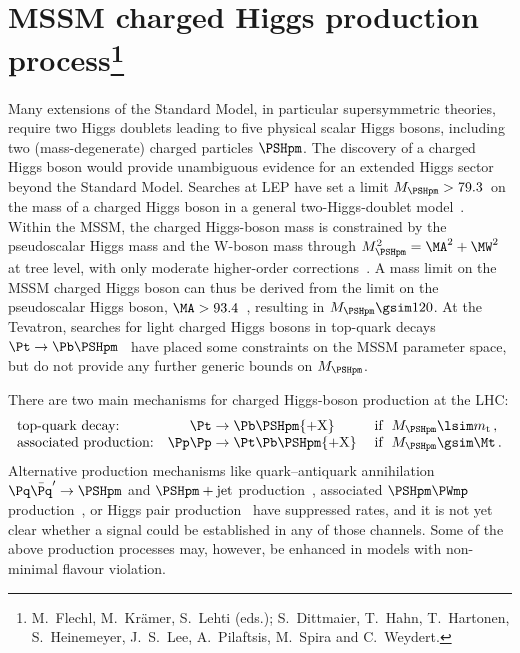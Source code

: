 \newcommand{\MHpm}{M_{\PSHpm}}

\section{MSSM charged Higgs production process\footnote{M.~Flechl,
    M.~Kr\"amer, S.~Lehti (eds.); S.~Dittmaier, T.~Hahn, 
    T.~Hartonen, S.~Heinemeyer, J.~S.~Lee, A.~Pilaftsis, 
    M.~Spira and C.~Weydert.}}
\label{sec:chiggs_intro}

Many extensions of the Standard Model, in particular supersymmetric
theories, require two Higgs doublets leading to five physical scalar
Higgs bosons, including two (mass-degenerate) charged particles $\PSHpm$.
The discovery of a charged Higgs boson would provide
unambiguous evidence for an extended Higgs sector beyond the Standard
Model. Searches at LEP have set a limit $\MHpm > 79.3$\UGeV\ 
on the mass of a charged Higgs boson in a general two-Higgs-doublet
model~\cite{Heister:2002ev}. Within the MSSM, the charged Higgs-boson
mass is constrained by the pseudoscalar Higgs mass and the W-boson
mass through $\MHpm^2 = \MA^2 + \MW^2$ at
tree level, with only moderate higher-order
corrections~\cite{Gunion:1988pc, Brignole:1991wp, Diaz:1991ki,
  Frank:2006yh}. A mass limit on the MSSM charged Higgs boson can thus
be derived from the limit on the pseudoscalar Higgs boson, 
$\MA > 93.4$\UGeV~\cite{Schael:2006cr}, resulting in 
$\MHpm \gsim 120$\UGeV. At the Tevatron, searches for light charged
Higgs bosons in top-quark decays $\Pt \to \Pb \PSHpm$~\cite{Aaltonen:2009ke,:2009zh} have placed some constraints
on the MSSM parameter space, but do not provide any further generic
bounds on $\MHpm$.

There are two main mechanisms for charged Higgs-boson production at
the LHC:
\begin{displaymath}
\begin{array}{lcl}
  \mbox{top-quark decay:} & \Pt \to \Pb \PSHpm{\rm + X} &\; {\rm if}\;\;
  \MHpm \lsim m_{\rm t}\,, \\
  \mbox{associated production:} & \Pp\Pp \to \Pt \Pb\PSHpm{\rm + X}
  &\; {\rm if}\;\; \MHpm \gsim \Mt\,.
\end{array}
\end{displaymath}
Alternative production mechanisms like quark--antiquark annihilation
$\Pq\bar \Pq'\to \PSHpm$ and $\PSHpm+\mathrm{jet}$ production~\cite{Dittmaier:2007uw},
associated $\PSHpm \PWmp$ production~\cite{Eriksson:2006yt}, or 
Higgs pair production~\cite{Alves:2005kr,Brein:1999sy} have
suppressed rates, and it is not yet clear whether a signal could be
established in any of those channels. 
Some of the above production processes may,
however, be enhanced in models with non-minimal flavour violation.

